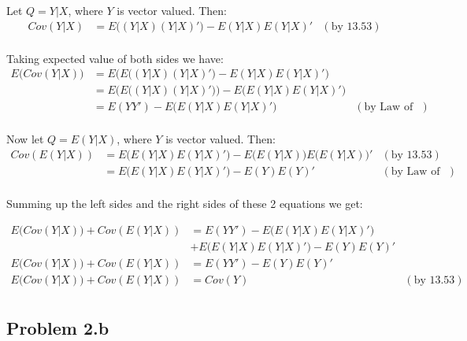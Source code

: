 \documentclass[letter]{article}
\begin{document}
Let $Q=Y|X$, where $Y$ is vector valued. 
Then:
\begin{equation*}
	\begin{aligned}
	Cov(Y|X) &= E\big((Y|X)(Y|X)'\big) - E(Y|X)E(Y|X)' &(\textrm{by 13.53})\\
	\end{aligned}
\end{equation*}

Taking expected value of both sides we have:
\begin{equation*}
	\begin{aligned}
	E\big(Cov(Y|X)\big) &= E\Big(E\big((Y|X)(Y|X)'\big) - E(Y|X)E(Y|X)'\Big)\\
	              &= E\Big(E\big((Y|X)(Y|X)'\big)\Big) - E\Big(E(Y|X)E(Y|X)'\Big)\\
	              &= E(YY') - E\Big(E(Y|X)E(Y|X)'\Big) &(\textrm{by Law of Tot. Expect.})\\
	\end{aligned}
\end{equation*}

Now let $Q=E(Y|X)$, where $Y$ is vector valued. 
Then:
\begin{equation*}
	\begin{aligned}
	Cov(E(Y|X)) &= E\big(E(Y|X)E(Y|X)'\big) - E\big(E(Y|X)\big)E\big(E(Y|X)\big)' &(\textrm{by 13.53})\\
	              &= E\big(E(Y|X)E(Y|X)'\big) - E(Y)E(Y)' &(\textrm{by Law of Tot. Expect.})\\
	\end{aligned}
\end{equation*}

Summing up the left sides and the right sides of these 2 equations we get:

\begin{equation*}
	\begin{aligned}
	E\big(Cov(Y|X)\big) + Cov(E(Y|X)) &= E(YY') - E\Big(E(Y|X)E(Y|X)'\Big) \\&+ E\big(E(Y|X)E(Y|X)'\big) - E(Y)E(Y)'\\
	E\big(Cov(Y|X)\big) + Cov(E(Y|X)) &= E(YY') - E(Y)E(Y)' \\
	E\big(Cov(Y|X)\big) + Cov(E(Y|X)) &= Cov(Y) &(\textrm{by 13.53})\\
	\end{aligned}
\end{equation*}


\subsection*{Problem 2.b} 
\end{document}
